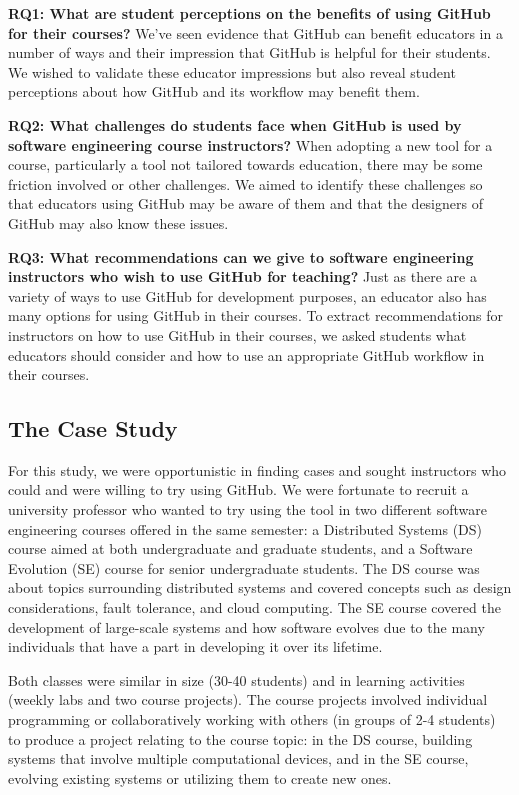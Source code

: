 \textbf{RQ1: What are student perceptions on the benefits of using GitHub for their courses?} We've seen evidence that GitHub can benefit educators in a number of ways \cite{zagalsky2015emergence} and their impression that GitHub is helpful for their students. We wished to validate these educator impressions but also reveal student perceptions about how GitHub and its workflow may benefit them.

\textbf{RQ2: What challenges do students face when GitHub is used by software engineering course instructors?} When adopting a new tool for a course, particularly a tool not tailored towards education, there may be some friction involved or other challenges. We aimed to identify these challenges so that educators using GitHub may be aware of them and that the designers of GitHub may also know these issues.

\textbf{RQ3: What recommendations can we give to software engineering instructors who wish to use GitHub for teaching?} Just as there are a variety of ways to use GitHub for development purposes, an educator also has many options for using GitHub in their courses. To extract recommendations for instructors on how to use GitHub in their courses, we asked students what educators should consider and how to use an appropriate GitHub workflow in their courses.

\subsection{The Case Study}
For this study, we were opportunistic in finding cases and sought instructors who could and were willing to try using GitHub. We were fortunate to recruit a university professor who wanted to try using the tool in two different software engineering courses offered in the same semester: a Distributed Systems (DS) course aimed at both undergraduate and graduate students, and a Software Evolution (SE) course for senior undergraduate students. The DS course was about topics surrounding distributed systems and covered concepts such as design considerations, fault tolerance, and cloud computing. The SE course covered the development of large-scale systems and how software evolves due to the many individuals that have a part in developing it over its lifetime.

Both classes were similar in size (30-40 students) and in learning activities (weekly labs and two course projects). The course projects involved individual programming or collaboratively working with others (in groups of 2-4 students) to produce a project relating to the course topic: in the DS course, building systems that involve multiple computational devices, and in the SE course, evolving existing systems or utilizing them to create new ones.

